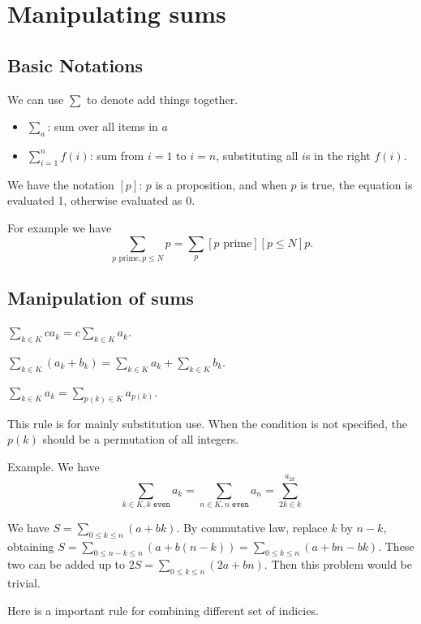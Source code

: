 \chapter{Manipulating sums}

\section{Basic Notations}

 We can use $\sum$ to denote add things together.
\begin{itemize}
    \item $\sum_{a}$: sum over all items in $a$
    \item $\sum_{i=1}^{n} f(i)$: sum from $i=1$ to $i=n$, substituting all $i$s
        in the right $f(i)$.
\end{itemize} 

 We have the notation $[p]$: $p$ is a proposition, and
when $p$ is true, the equation is evaluated 1, otherwise evaluated as 0. 

 For example we have 
\[
    \sum_{p\text{ prime},p \leq N} p = \sum_p [p\text{ prime}][p \leq N] p.
\]

\section{Manipulation of sums}

 $\sum_{k\in K} ca_k=c\sum_{k\in K}a_k$.

 $\sum_{k\in K} (a_k+b_k)=\sum_{k\in K}a_k+\sum_{k\in K}b_k$.

 $\sum_{k\in K} a_k=\sum_{p(k)\in K}a_{p(k)}$. 

This rule is for mainly substitution use. When the condition is not specified, the
$p(k)$ should be a permutation of all integers. 

Example. We have 
\[
    \sum_{k\in K, k \texttt{ even}}^{} a_k = \sum_{n\in K, n \texttt{ even}}^{}a_n
    =\sum_{2k \in k}^{a_{2k}}
\]


 We have $S=\sum_{0\leq k\leq
n}(a+bk)$. By commutative law, replace $k$ by $n-k$, obtaining $S=\sum_{0\leq
n-k\leq n}(a+b(n-k))=\sum_{0\leq k \leq n} (a+bn-bk)$. These two can be added
up to $2S=\sum_{0 \leq k\leq n} (2a+bn)$. Then this problem would be trivial. 

 Here is a important rule for combining
different set of indicies. 


